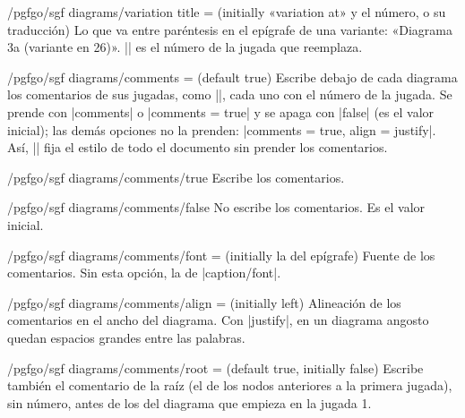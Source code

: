\begin{key}{/pgfgo/sgf diagrams/variation title =  (initially «variation at» y el número, o su traducción)}
	Lo que va entre paréntesis en el epígrafe de una variante: «Diagrama 3a (variante en 26)». |\pgfgovariationmove| es el número de la jugada que reemplaza.
\end{key}

\begin{key}{/pgfgo/sgf diagrams/comments =  (default true)}
	Escribe debajo de cada diagrama los comentarios de sus jugadas, como |\sgfcomment|, cada uno con el número de la jugada. Se prende con |comments| o |comments = true| y se apaga con |false| (es el valor inicial); las demás opciones no la prenden: |comments = {true, align = justify}|. Así, || fija el estilo de todo el documento sin prender los comentarios.
\end{key}

\begin{stylekey}{/pgfgo/sgf diagrams/comments/true}
	Escribe los comentarios.
\end{stylekey}

\begin{stylekey}{/pgfgo/sgf diagrams/comments/false}
	No escribe los comentarios. Es el valor inicial.
\end{stylekey}

\begin{key}{/pgfgo/sgf diagrams/comments/font =  (initially la del epígrafe)}
	Fuente de los comentarios. Sin esta opción, la de |caption/font|.
\end{key}

\begin{key}{/pgfgo/sgf diagrams/comments/align =  (initially left)}
	Alineación de los comentarios en el ancho del diagrama. Con |justify|, en un diagrama angosto quedan espacios grandes entre las palabras.
\end{key}

\begin{key}{/pgfgo/sgf diagrams/comments/root =  (default true, initially false)}
	Escribe también el comentario de la raíz (el de los nodos anteriores a la primera jugada), sin número, antes de los del diagrama que empieza en la jugada 1.

	\begin{codeexample}
	\end{codeexample}
\end{key}

